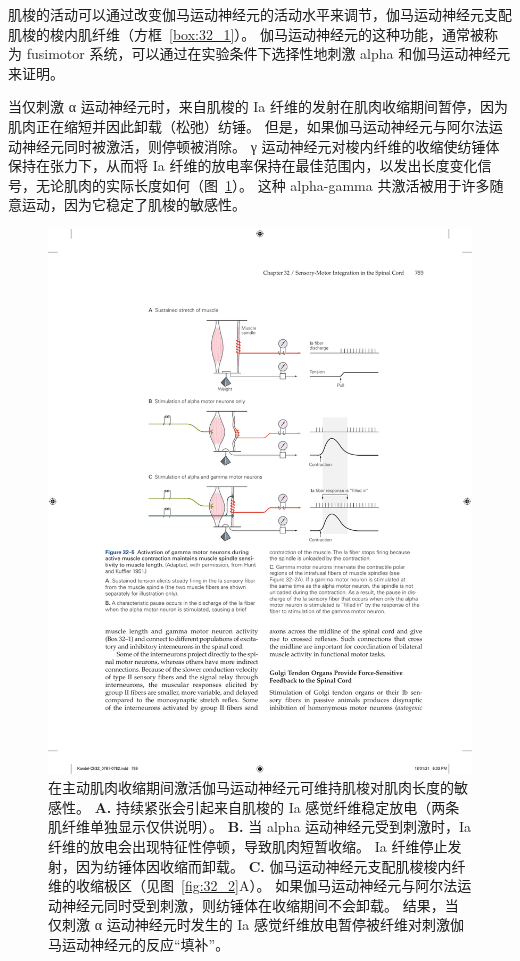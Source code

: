 肌梭的活动可以通过改变伽马运动神经元的活动水平来调节，伽马运动神经元支配肌梭的梭内肌纤维（方框~\ref{box:32_1}）。
伽马运动神经元的这种功能，通常被称为 fusimotor 系统，可以通过在实验条件下选择性地刺激 alpha 和伽马运动神经元来证明。


当仅刺激 α 运动神经元时，来自肌梭的 Ia 纤维的发射在肌肉收缩期间暂停，因为肌肉正在缩短并因此卸载（松弛）纺锤。
但是，如果伽马运动神经元与阿尔法运动神经元同时被激活，则停顿被消除。
γ 运动神经元对梭内纤维的收缩使纺锤体保持在张力下，从而将 Ia 纤维的放电率保持在最佳范围内，以发出长度变化信号，无论肌肉的实际长度如何（图~\ref{fig:32_5}）。 
这种 alpha-gamma 共激活被用于许多随意运动，因为它稳定了肌梭的敏感性。


\begin{figure}[htbp]
	\centering
	\includegraphics[width=0.75\linewidth]{chap32/fig_32_5}
	\caption{在主动肌肉收缩期间激活伽马运动神经元可维持肌梭对肌肉长度的敏感性\cite{hunt1951stretch}。 
	\textbf{A.} 持续紧张会引起来自肌梭的 Ia 感觉纤维稳定放电（两条肌纤维单独显示仅供说明）。 
	\textbf{B.} 当 alpha 运动神经元受到刺激时，Ia 纤维的放电会出现特征性停顿，导致肌肉短暂收缩。
	Ia 纤维停止发射，因为纺锤体因收缩而卸载。
	\textbf{C.} 伽马运动神经元支配肌梭梭内纤维的收缩极区（见图~\ref{fig:32_2}A）。
	如果伽马运动神经元与阿尔法运动神经元同时受到刺激，则纺锤体在收缩期间不会卸载。
	结果，当仅刺激 α 运动神经元时发生的 Ia 感觉纤维放电暂停被纤维对刺激伽马运动神经元的反应“填补”。}
	\label{fig:32_5}
\end{figure}


